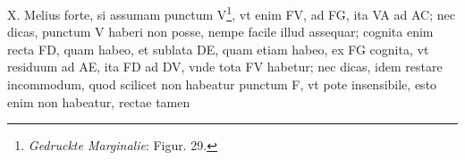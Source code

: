 \pend \pstart [p.~39] X. Melius forte, si assumam punctum V\footnote{\textit{Gedruckte Marginalie}: Figur. 29.}, vt enim FV, ad FG, ita VA ad AC; nec dicas, punctum V haberi non posse, nempe facile illud assequar; cognita enim recta FD, quam habeo, et sublata DE, quam etiam habeo, ex FG cognita, vt residuum ad AE, ita FD ad DV, vnde tota FV habetur; nec dicas, idem restare incommodum, quod scilicet non habeatur punctum F, vt pote insensibile, esto enim non habeatur, rectae tamen 